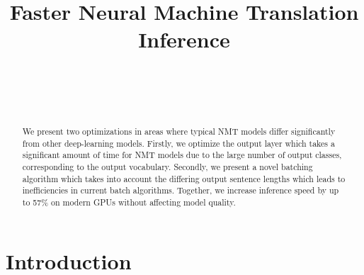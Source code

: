 \documentclass[11pt,a4paper]{article}
\begin{document}
\title{\bf Faster Neural Machine Translation Inference}  

\author{ \hfill  {}\\ 
        \addr{}
\AND
        \hfill {}\\
\AND
        \hfill {}\\
}

\maketitle
\pagestyle{empty}

\begin{abstract}

We present two optimizations in areas where typical NMT models differ significantly from other deep-learning models. Firstly, we optimize the output layer which takes a significant amount of time for NMT models due to the large number of output classes, corresponding to the output vocabulary. Secondly, we present a novel batching algorithm which takes into account the differing output sentence lengths which leads to inefficiencies in current batch algorithms. Together, we increase inference speed by up to 57\% on modern GPUs without affecting model quality.

\end{abstract}

\section{Introduction}
\label{sec:Introduction}
\end{document}
